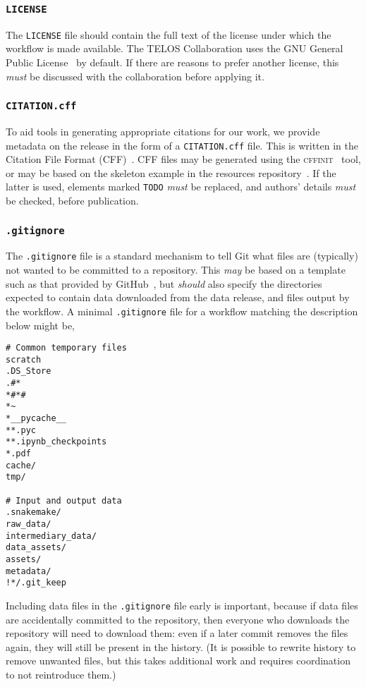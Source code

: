 \documentclass{article}
\newcommand\rfcword[1]{\emph{#1}\xspace}
\newcommand\must{\rfcword{must}}
\newcommand\should{\rfcword{should}}
\newcommand\may{\rfcword{may}}
\newcommand\filename[1]{\texttt{#1}\xspace}
\newcommand\program[1]{\textsc{#1}\xspace}
\begin{document}
\subsubsection{\filename{LICENSE}}

The \filename{LICENSE} file should contain
the full text of the license under which the workflow is made available.
The TELOS Collaboration uses the GNU General Public License~\cite{gpl} by default.
If there are reasons to prefer another license,
this \must be discussed with the collaboration before applying it.

\subsubsection{\filename{CITATION.cff}}

To aid tools in generating appropriate citations for our work,
we provide metadata on the release in the form of a \filename{CITATION.cff} file.
This is written in the Citation File Format (CFF)~\cite{cff}.
CFF files may be generated using the \program{cffinit}~\cite{cffinit} tool,
or may be based on the skeleton example in the resources repository~\cite{resources}.
If the latter is used,
elements marked \verb|TODO| \must be replaced,
and authors' details \must be checked,
before publication.

\subsubsection{\filename{.gitignore}}

The \filename{.gitignore} file is a standard mechanism to tell Git
what files are
(typically)
not wanted to be committed to a repository.
This \may be based on a template such as that provided by GitHub~\cite{gitignore-python},
but \should also specify the directories expected to contain
data downloaded from the data release,
and files output by the workflow.
A minimal \filename{.gitignore} file for a workflow matching the description below might be,

\begin{verbatim}
# Common temporary files
scratch
.DS_Store
.#*
*#*#
*~
*__pycache__
**.pyc
**.ipynb_checkpoints
*.pdf
cache/
tmp/

# Input and output data
.snakemake/
raw_data/
intermediary_data/
data_assets/
assets/
metadata/
!*/.git_keep
\end{verbatim}

Including data files in the \filename{.gitignore} file early is important,
because if data files are accidentally committed to the repository,
then everyone who downloads the repository will need to download them:
even if a later commit removes the files again,
they will still be present in the history.
(It is possible to rewrite history to remove unwanted files,
but this takes additional work and requires coordination to not reintroduce them.)
\end{document}
